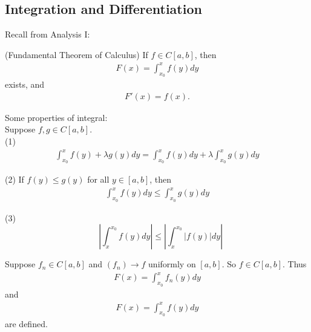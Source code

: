 \documentclass[a4paper]{article}
\begin{document}
\subsection{Integration and Differentiation}
Recall from Analysis I:

\begin{thm} (Fundamental Theorem of Calculus) If $f\in C\left[a,b\right]$, then
\begin{equation*}
\begin{aligned}
F\left(x\right) = \int_{x_0}^x f\left(y\right) dy
\end{aligned}
\end{equation*}
exists, and 
\begin{equation*}
\begin{aligned}
F'\left(x\right) = f\left(x\right).
\end{aligned}
\end{equation*}
\end{thm}

Some properties of integral:\\
Suppose $f,g \in C\left[a,b\right]$.\\
(1)
\begin{equation*}
\begin{aligned}
\int_{x_0}^x f\left(y\right)+\lambda g\left(y\right) dy = \int_{x_0}^x f\left(y\right) dy + \lambda \int_{x_0}^x g\left(y\right) dy
\end{aligned}
\end{equation*}

(2) If $f\left(y\right) \leq g\left(y\right)$ for all $y\in\left[a,b\right]$, then
\begin{equation*}
\begin{aligned}
\int_{x_0}^x f\left(y\right)dy \leq \int_{x_0}^x g\left(y\right) dy
\end{aligned}
\end{equation*}

(3) 
\begin{equation*}
\begin{aligned}
\end{aligned}
\left|\int_{x}^{x_0} f\left(y\right) dy \right| \leq \left|\int_x^{x_0} \left|f\left(y\right)\right|dy\right|
\end{equation*}

Suppose $f_n \in C\left[a,b\right]$ and $\left(f_n\right) \to f$ uniformly on $\left[a,b\right]$. So $f\in C\left[a,b\right]$. Thus
\begin{equation*}
\begin{aligned}
F\left(x\right) = \int_{x_0}^x f_n\left(y\right) dy
\end{aligned}
\end{equation*}
and
\begin{equation*}
\begin{aligned}
F\left(x\right) = \int_{x_0}^x f\left(y\right) dy
\end{aligned}
\end{equation*}
are defined.
\end{document}
